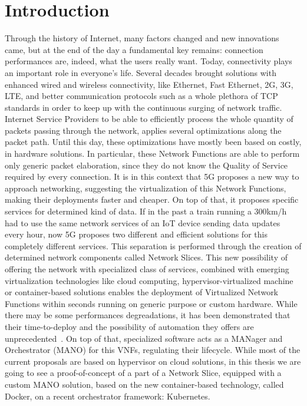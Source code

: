 \chapter{Introduction}
\label{chap:intro}

Through the history of Internet, many factors changed and new innovations came,
but at the end of the day a fundamental key remains: connection performances
are, indeed, what the users really want.
Today, connectivity plays an important role in everyone's life. Several decades 
brought solutions with enhanced wired and wireless connectivity, like 
Ethernet, Fast Ethernet, 2G, 3G, LTE, and better communication protocols such 
as a whole plethora of TCP standards in order to keep up with the continuous 
surging of network traffic. Internet Service Providers to be able to 
efficiently process the whole quantity of packets passing through the network, 
applies several optimizations along the packet path. Until this day, these 
optimizations have mostly been based on costly, in hardware solutions. In 
particular, these Network Functions are able to perform only generic packet 
elaboration, since they do not know the Quality of Service required by every 
connection. It is in this context that 5G proposes a new way to approach 
networking, suggesting the virtualization of this Network Functions, making 
their deployments faster and cheaper. On top of that, it proposes specific 
services for determined kind of data. If in the past a train running a 
300km/h had to use the same network services of an IoT device sending data 
updates every hour, now 5G proposes two different and efficient solutions for 
this completely different services. This separation is performed through the 
creation of determined network components called Network Slices. This new 
possibility of offering the network with specialized class of services, 
combined with emerging virtualization technologies like cloud computing, 
hypervisor-virtualized machine or container-based solutions enables the 
deployment of Virtualized Network Functions within seconds running on generic 
purpose or custom hardware. While there may be some performances degreadations, 
it has been demonstrated that their time-to-deploy and the possibility of 
automation they offers are unprecedented~\cite{nguyen2017sdn}. On top of 
that, specialized software acts as a MANager and Orchestrator (MANO) for this 
VNFs, regulating their lifecycle. While most of the current proposals are based 
on hypervisor on cloud solutions, in this thesis we are going to see a 
proof-of-concept of a part of a Network Slice, equipped with a custom MANO 
solution, based on the new container-based technology, called Docker, on a 
recent orchestrator framework: Kubernetes.
 
